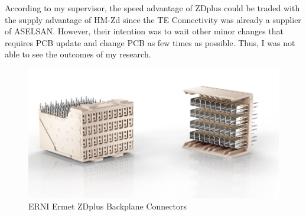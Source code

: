 	According to my supervisor, the speed advantage of ZDplus could be traded with the supply advantage of HM-Zd since the TE Connectivity was already a supplier of ASELSAN. However, their intention was to wait other minor changes that requires PCB update and change PCB as few times as possible. Thus, I was not able to see the outcomes of my research.



\begin{figure}[H]
	\center
	\setlength{\unitlength}{\textwidth} 
	\includegraphics[width=0.9\unitlength]{ermetzd2}
	\caption{\label{fig:ermetzd} ERNI Ermet ZDplus Backplane Connectors \cite{ermetzd} }
\end{figure}






\- \vfill

								
	
 
